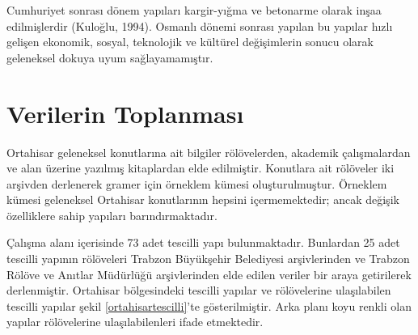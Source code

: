 \documentclass[12pt,turkish,a4paperpaper,]{report}
\begin{document}
Cumhuriyet sonrası dönem yapıları kargir-yığma ve betonarme olarak inşaa
edilmişlerdir (Kuloğlu, 1994). Osmanlı dönemi sonrası yapılan bu yapılar
hızlı gelişen ekonomik, sosyal, teknolojik ve kültürel değişimlerin
sonucu olarak geleneksel dokuya uyum sağlayamamıştır.

\hypertarget{verilerin-toplanmasux131}{%
\section{Verilerin Toplanması}\label{verilerin-toplanmasux131}}

Ortahisar geleneksel konutlarına ait bilgiler rölövelerden, akademik
çalışmalardan ve alan üzerine yazılmış kitaplardan elde edilmiştir.
Konutlara ait rölöveler iki arşivden derlenerek gramer için örneklem
kümesi oluşturulmuştur. Örneklem kümesi geleneksel Ortahisar
konutlarının hepsini içermemektedir; ancak değişik özelliklere sahip
yapıları barındırmaktadır.

Çalışma alanı içerisinde 73 adet tescilli yapı bulunmaktadır. Bunlardan
25 adet tescilli yapının rölöveleri Trabzon Büyükşehir Belediyesi
arşivlerinden ve Trabzon Rölöve ve Anıtlar Müdürlüğü arşivlerinden elde
edilen veriler bir araya getirilerek derlenmiştir. Ortahisar
bölgesindeki tescilli yapılar ve rölövelerine ulaşılabilen tescilli
yapılar şekil \ref{ortahisartescilli}'te gösterilmiştir. Arka planı koyu
renkli olan yapılar rölövelerine ulaşılabilenleri ifade etmektedir.
\end{document}
